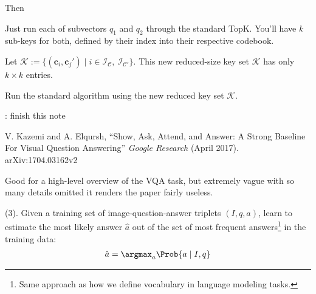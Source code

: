 \documentclass[11pt]{article}
\renewcommand\vec[2][]{\bm{#2}_{#1}}
\newcommand\myspace[1][]{\vspace{#1\bigskipamount}}
\newcommand\p{\Needspace{10\baselineskip} \noindent}
\newcommand\bluesec[1]{\myspace \p \blue{#1}}
\begin{document}
Then\textellipsis
\begin{compactenum}
	\item Just run each of subvectors $q_1$ and $q_2$ through the standard TopK. You'll have $k$ sub-keys for both, defined by their index into their respective codebook. 
	
	\item Let $\mathcal K := \{ (\vec[i]{c}, \vec[j]{c}') \mid i \in \mathcal I_{\mathcal C}, ~ \mathcal I_{\mathcal C'}  \}$. This new reduced-size key set $\mathcal K$ has only $k \times k$ entries.
	
	\item Run the standard algorithm using the new reduced key set $\mathcal K$. 
\end{compactenum}

: finish this note






\vspace{-1em}
{\footnotesize V. Kazemi and A. Elqursh, ``Show, Ask, Attend, and Answer: A Strong Baseline For Visual Question Answering'' \textit{Google Research} (April 2017).  arXiv:1704.03162v2}

\bluesec{TL;DR:} Good for a high-level overview of the VQA task, but extremely vague with so many details omitted it renders the paper fairly useless. 

\bluesec{Method} (3). Given a training set of image-question-answer triplets $(I, q, a)$, learn to estimate the most likely answer $\hat a$ out of the set of most frequent answers\footnote{Same approach as how we define vocabulary in language modeling tasks.} in the training data:
\begin{align}
	\hat a = \argmax_{a} \Prob{a \mid I, q}
\end{align}
\end{document}
